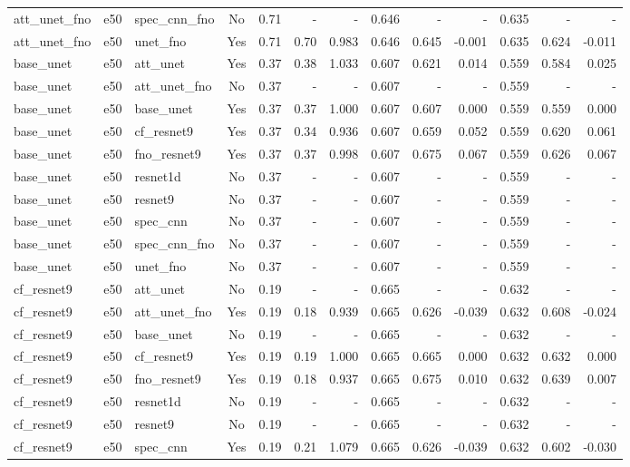 \begin{tabular}{l l l c r r r r r r r r r}
att_unet_fno & e50 & spec_cnn_fno & No & 0.71 & - & - & 0.646 & - & - & 0.635 & - & - \\
att_unet_fno & e50 & unet_fno & Yes & 0.71 & 0.70 & 0.983 & 0.646 & 0.645 & -0.001 & 0.635 & 0.624 & -0.011 \\
base_unet & e50 & att_unet & Yes & 0.37 & 0.38 & 1.033 & 0.607 & 0.621 & 0.014 & 0.559 & 0.584 & 0.025 \\
base_unet & e50 & att_unet_fno & No & 0.37 & - & - & 0.607 & - & - & 0.559 & - & - \\
base_unet & e50 & base_unet & Yes & 0.37 & 0.37 & 1.000 & 0.607 & 0.607 & 0.000 & 0.559 & 0.559 & 0.000 \\
base_unet & e50 & cf_resnet9 & Yes & 0.37 & 0.34 & 0.936 & 0.607 & 0.659 & 0.052 & 0.559 & 0.620 & 0.061 \\
base_unet & e50 & fno_resnet9 & Yes & 0.37 & 0.37 & 0.998 & 0.607 & 0.675 & 0.067 & 0.559 & 0.626 & 0.067 \\
base_unet & e50 & resnet1d & No & 0.37 & - & - & 0.607 & - & - & 0.559 & - & - \\
base_unet & e50 & resnet9 & No & 0.37 & - & - & 0.607 & - & - & 0.559 & - & - \\
base_unet & e50 & spec_cnn & No & 0.37 & - & - & 0.607 & - & - & 0.559 & - & - \\
base_unet & e50 & spec_cnn_fno & No & 0.37 & - & - & 0.607 & - & - & 0.559 & - & - \\
base_unet & e50 & unet_fno & No & 0.37 & - & - & 0.607 & - & - & 0.559 & - & - \\
cf_resnet9 & e50 & att_unet & No & 0.19 & - & - & 0.665 & - & - & 0.632 & - & - \\
cf_resnet9 & e50 & att_unet_fno & Yes & 0.19 & 0.18 & 0.939 & 0.665 & 0.626 & -0.039 & 0.632 & 0.608 & -0.024 \\
cf_resnet9 & e50 & base_unet & No & 0.19 & - & - & 0.665 & - & - & 0.632 & - & - \\
cf_resnet9 & e50 & cf_resnet9 & Yes & 0.19 & 0.19 & 1.000 & 0.665 & 0.665 & 0.000 & 0.632 & 0.632 & 0.000 \\
cf_resnet9 & e50 & fno_resnet9 & Yes & 0.19 & 0.18 & 0.937 & 0.665 & 0.675 & 0.010 & 0.632 & 0.639 & 0.007 \\
cf_resnet9 & e50 & resnet1d & No & 0.19 & - & - & 0.665 & - & - & 0.632 & - & - \\
cf_resnet9 & e50 & resnet9 & No & 0.19 & - & - & 0.665 & - & - & 0.632 & - & - \\
cf_resnet9 & e50 & spec_cnn & Yes & 0.19 & 0.21 & 1.079 & 0.665 & 0.626 & -0.039 & 0.632 & 0.602 & -0.030 \\

\end{tabular}
